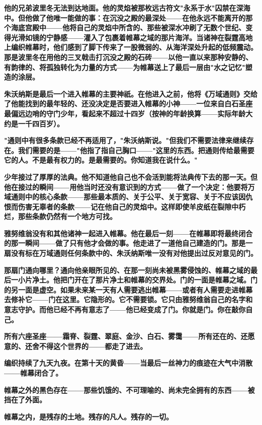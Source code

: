 \documentclass[12pt,a4paper,openany]{ctexbook}
\begin{document}
\textbf{他的兄弟波里冬无法到达地面。他的灵焰被那枚远古符文"永系于水"囚禁在深海中。但他做了他唯一能做的事：在沉没之殿的最深处——在他永远不能离开的那个海底宫殿中——他将自己的灵焰中所含的、那些被深水冲刷了无数个世纪、变得光滑如镜的宁静感——灌入了包裹着帷幕之域的那片海洋。当诸神在裂霆高地上编织帷幕时，他们感到了脚下传来了一股微弱的、从海洋深处升起的低频震动。那是波里冬在用他的三叉戟击打沉没之殿的石砖——以他一直以来那种安静的、有韵律的、将孤独转化为力量的方式——为帷幕送上了最后一层由"水之记忆"塑造的涂层。}


\textbf{朱沃纳斯是最后一个进入帷幕的主要神祇。在他进入之前，他将《万域通则》交给了他能找到的最年轻的、还没决定是否要进入帷幕的小神——一位来自白石圣座最偏远边哨的守门少年，看起来不超过十四岁（按神的年龄换算——实际年龄大约是一千四百岁）。}


\textbf{"通则中有很多条款已经不再适用了，"朱沃纳斯说。"但我们不需要法律来继续存在。我们需要的是——"他指了指自己胸口——"这里的东西。把通则传给最需要它的人。不是最有权力的。是最需要的。你知道我在说什么。"}


\textbf{少年接过了厚厚的法典。他不知道他自己也不会活到能将法典传下去的那一天。但他在接过的瞬间——用他当时还没有意识到的方式——做了一个决定：他要将万域通则中的核心条款——那些最本质的、关于公平、关于宽容、关于不应该因仇恨而伤害无辜者的条款——记在他自己的灵焰中。这样即使羊皮纸在裂隙中朽烂，那些条款仍然有一个地方可找。}


\textbf{雅努维翁没有和其他诸神一起进入帷幕。他在最后一刻——在帷幕即将最终闭合的那一瞬间——做了只有他才会做的事。他走进了一道他自己建造的门。那是一扇没有标在万域通则任何条款中的、朱沃纳斯唯一没有对他提出过反对意见的门。}


\textbf{那扇门通向哪里？通向他亲眼所见的、在那一刻尚未被黑雾侵蚀的、帷幕之域的最后一小片净土。他把门开在了那片净土和帷幕的交界处。门的一面是帷幕之域。门的另一面是虚空。如果未来某一天有人需要逃出帷幕——或者有人需要走进帷幕去修补它——门在这里。它隐形的。它不需要锁。它只由雅努维翁自己的名字和意志守护。而他已经不再有意志了——他已经变成了门。你就是门。你在敲你自己。}


\textbf{所有六座圣座——霜脊、裂霆、翠庭、金沙、白石、雾霭——所有还在的、还愿意的、还舍不得这个世界的——都走了进去。}


\textbf{编织持续了九天九夜。在第十天的黄昏——当最后一丝神力的痕迹在大气中消散——帷幕闭合了。}


\textbf{帷幕之外的黑色存在——那些饥饿的、不可理喻的、尚未完全拥有的东西——被挡在了外面。}


\textbf{帷幕之内，是残存的土地。残存的凡人。残存的一切。}
\end{document}
